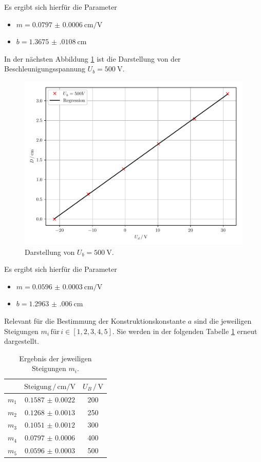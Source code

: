 Es ergibt sich hierfür die Parameter
\begin{itemize}
  \item $m=\SI{0.0797(6)}{\centi\meter\per\volt}$
  \item $b=\SI{1.3675(0108)}{\centi\meter}$
\end{itemize}
In der nächsten Abbildung \ref{abb:10} ist die Darstellung von der Beschleunigungsspannung $U_b=\SI{500}{\volt}$.
\begin{figure}[H]
  \centering
  \includegraphics{plot5.pdf}
  \caption{Darstellung von $U_b=\SI{500}{\volt}$.}
  \label{abb:10}
\end{figure}
Es ergibt sich hierfür die Parameter
\begin{itemize}
  \item $m=\SI{0.0596(3)}{\centi\meter\per\volt}$
  \item $b=\SI{1.2963(0060)}{\centi\meter}$
\end{itemize}
Relevant für die Bestimmung der Konstruktionskonstante $a$ sind die jeweiligen Steigungen $m_i \,\text{für} \, i \in [1,2,3,4,5]$.
Sie werden in der folgenden Tabelle \ref{tab:2} erneut dargestellt.
\begin{table}[H]
  \centering
  \caption{Ergebnis der jeweiligen Steigungen $m_i$.}
  \label{tab:2}
  \begin{tabular}{c c c}
\toprule
&$\text{Steigung} \,/\, \si{\centi\meter\per\volt}$& $U_B \, /\, \si{\volt}$\\
\midrule
$m_1$ & $\num{0.1587(22)}$& 200\\
$m_2$ & $\num{0.1268(13)}$& 250\\
$m_3$ & $\num{0.1051(12)}$& 300\\
$m_4$ & $\num{0.0797(6)}$ & 400\\
$m_5$ & $\num{0.0596(3)}$ & 500\\
\bottomrule
  \end{tabular}
\end{table}
